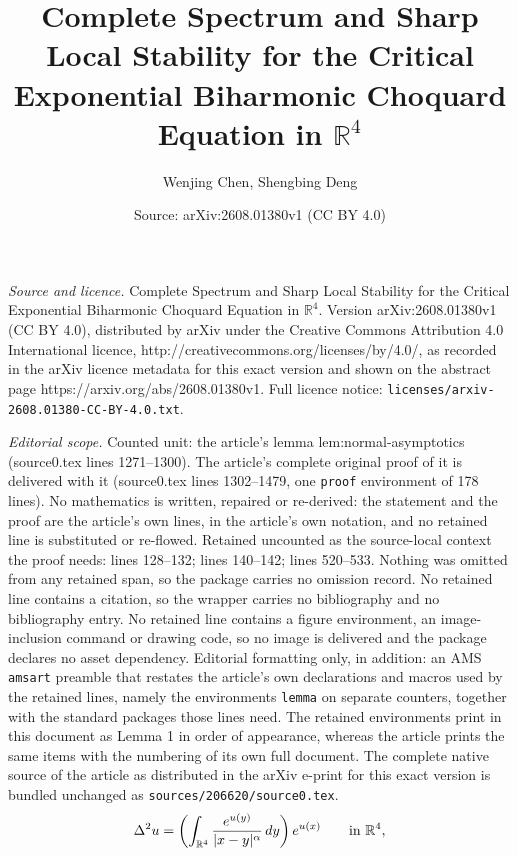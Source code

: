 \documentclass[10pt,a4paper]{amsart}
\title{Complete Spectrum and Sharp Local Stability for the Critical Exponential Biharmonic Choquard Equation in \(\mathbb R^{4}\)}
\author{Wenjing Chen, Shengbing Deng}
\date{Source: arXiv:2608.01380v1 (CC BY 4.0)}
\begin{document}
\maketitle

\noindent\emph{Source and licence.} Complete Spectrum and Sharp Local Stability for the Critical Exponential Biharmonic Choquard Equation in \(\mathbb R^{4}\). Version arXiv:2608.01380v1 (CC BY 4.0), distributed by arXiv under the Creative Commons Attribution 4.0 International licence, http://creativecommons.org/licenses/by/4.0/, as recorded in the arXiv licence metadata for this exact version and shown on the abstract page https://arxiv.org/abs/2608.01380v1. Full licence notice: \texttt{licenses/arxiv-2608.01380-CC-BY-4.0.txt}.\par\smallskip

\noindent\textit{Editorial scope.} Counted unit: the article's lemma lem:normal-asymptotics (source0.tex lines 1271--1300). The article's complete original proof of it is delivered with it (source0.tex lines 1302--1479, one \texttt{proof} environment of 178 lines). No mathematics is written, repaired or re-derived: the statement and the proof are the article's own lines, in the article's own notation, and no retained line is substituted or re-flowed.  Retained uncounted as the source-local context the proof needs: lines 128--132; lines 140--142; lines 520--533.  Nothing was omitted from any retained span, so the package carries no omission record.  No retained line contains a citation, so the wrapper carries no bibliography and no bibliography entry.  No retained line contains a figure environment, an image-inclusion command or drawing code, so no image is delivered and the package declares no asset dependency.  Editorial formatting only, in addition: an AMS \texttt{amsart} preamble that restates the article's own declarations and macros used by the retained lines, namely the environments \texttt{lemma} on separate counters, together with the standard packages those lines need.  The retained environments print in this document as Lemma 1 in order of appearance, whereas the article prints the same items with the numbering of its own full document.  The complete native source of the article as distributed in the arXiv e-print for this exact version is bundled unchanged as \texttt{sources/206620/source0.tex}.
\begin{equation}\label{eq:main}
\Delta^{2}u=
\left(\int_{\mathbb R^{4}}\frac{e^{u(y)}}{|x-y|^{\alpha}}\,dy\right)e^{u(x)}
\qquad\hbox{in }\mathbb R^{4},
\end{equation}
\end{document}
